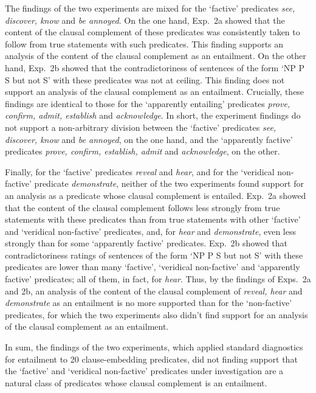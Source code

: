 \documentclass[11pt,fleqn]{article}
\newcommand{\6}{\mbox{$[\hspace*{-.6mm}[$}}
\newcommand{\9}{\mbox{$]\hspace*{-.6mm}]$}}
\begin{document}
{The findings of the two experiments are mixed for the `factive' predicates {\em see, discover, know} and {\em be annoyed}. On the one hand, Exp.~2a showed that the content of the clausal complement of these predicates was consistently taken to follow from true statements with such predicates. This finding supports an analysis of the content of the clausal complement as an entailment. On the other hand, Exp.~2b showed that the contradictoriness of sentences of the form `NP P S but not S' with these predicates was not at ceiling. This finding does not support an analysis of the clausal complement as an entailment. Crucially, these findings are identical to those for the `apparently entailing' predicates {\em prove, confirm, admit, establish} and {\em acknowledge}. In short, the experiment findings do not support a non-arbitrary division between the  `factive' predicates {\em see, discover, know} and {\em be annoyed}, on the one hand, and the `apparently factive' predicates {\em prove, confirm, establish, admit} and {\em acknowledge}, on the other.

Finally, for the `factive' predicates {\em reveal} and {\em hear}, and for the `veridical non-factive' predicate {\em demonstrate}, neither of the two experiments found support for an analysis as a predicate whose clausal complement is entailed. Exp.~2a showed that the content of the clausal complement follows less strongly from true statements with these predicates than from true statements with other `factive' and `veridical non-factive' predicates, and, for {\em hear} and {\em demonstrate}, even less strongly than for some `apparently factive' predicates. Exp.~2b showed that  contradictoriness ratings of sentences of the form `NP P S but not S' with these predicates are lower than many `factive', `veridical non-factive' and `apparently factive' predicates; all of them, in fact, for {\em hear}. Thus, by the findings of Exps.~2a and 2b, an analysis of the content of the clausal complement of {\em reveal, hear} and {\em demonstrate} as an entailment is no more supported than for the `non-factive' predicates, for which the two experiments also didn't find support for an analysis of the clausal complement as an entailment. 

In sum, the findings of the two experiments, which applied standard diagnostics for entailment to 20 clause-embedding predicates, did not finding support that the `factive' and `veridical non-factive' predicates under investigation are a natural class of predicates whose clausal complement is an entailment. 

}
\end{document}
